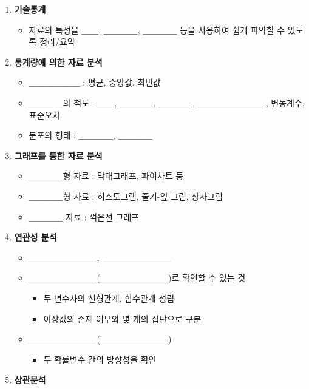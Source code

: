 \documentclass[11pt]{article}
\providecommand{\tightlist}{%
      \setlength{\itemsep}{0pt}\setlength{\parskip}{0pt}}
\begin{document}
\begin{enumerate}
\def\labelenumi{\arabic{enumi}.}
\tightlist
\item
  \textbf{기술통계}

  \begin{itemize}
  \tightlist
  \item
    자료의 특성을 ＿＿, ＿＿＿＿, ＿＿＿＿ 등을 사용하여 쉽게 파악할 수
    있도록 정리/요약 
  \end{itemize}
\item
  \textbf{통계량에 의한 자료 분석}

  \begin{itemize}
  \tightlist
  \item
    ＿＿＿＿＿＿ : 평균, 중앙값, 최빈값
  \item
    ＿＿＿＿의 척도 : ＿＿, ＿＿＿＿, ＿＿＿＿, ＿＿＿＿＿＿＿＿,
    변동계수, 표준오차
  \item
    분포의 형태 : ＿＿＿＿, ＿＿＿＿ 
  \end{itemize}
\item
  \textbf{그래프를 통한 자료 분석}

  \begin{itemize}
  \tightlist
  \item
    ＿＿＿＿형 자료 : 막대그래프, 파이차트 등
  \item
    ＿＿＿＿형 자료 : 히스토그램, 줄기-잎 그림, 상자그림
  \item
    ＿＿＿＿ 자료 : 꺽은선 그래프 
  \end{itemize}
\item
  \textbf{연관성 분석}

  \begin{itemize}
  \tightlist
  \item
    ＿＿＿＿＿＿＿＿, ＿＿＿＿＿＿＿＿
  \item
    ＿＿＿＿＿＿＿＿(＿＿＿＿＿＿＿＿)로 확인할 수 있는 것

    \begin{itemize}
    \tightlist
    \item
      두 변수사의 선형관계, 함수관계 성립
    \item
      이상값의 존재 여부와 몇 개의 집단으로 구분
    \end{itemize}
  \item
    ＿＿＿＿＿＿＿＿(＿＿＿＿＿＿＿＿)

    \begin{itemize}
    \tightlist
    \item
      두 확률변수 간의 방향성을 확인 
    \end{itemize}
  \end{itemize}
\item
  \textbf{상관분석}


\end{enumerate}
\end{document}
